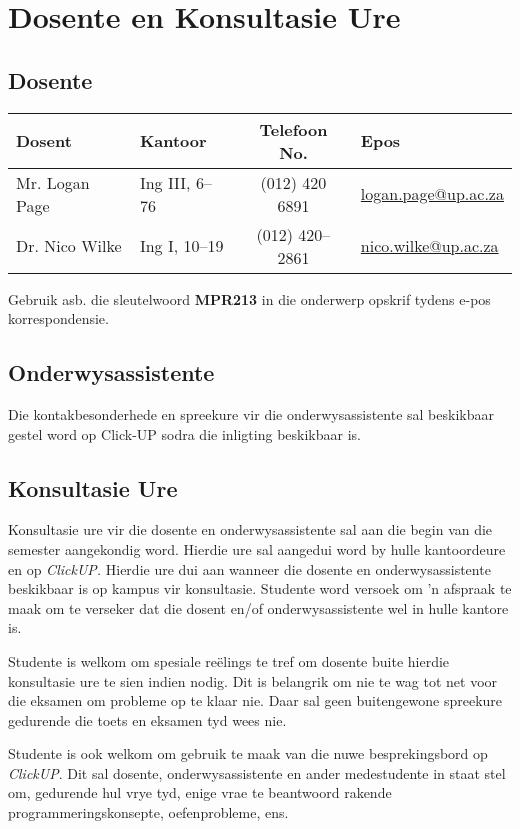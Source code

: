 \section{Dosente en Konsultasie Ure}
    \subsection{Dosente}
        \begin{table}[!h]
            \begin{center}
             \begin{tabular}{|l|l|c|l|}
                 \hline
                 {\bf Dosent} & {\bf Kantoor} & {\bf Telefoon No.} & {\bf Epos} \\
                 \hline
                 Mr. Logan Page &
                 Ing III, 6--76 &
                 (012) 420 6891 &
                 \href{mailto:logan.page@up.ac.za}{logan.page@up.ac.za} \\
                 Dr. Nico Wilke &
                 Ing I, 10--19 &
                 (012) 420--2861 &
                 \href{mailto:nico.wilke@up.ac.za}{nico.wilke@up.ac.za} \\
                 \hline
             \end{tabular}
            \end{center}
        \end{table}

      Gebruik asb. die sleutelwoord \textbf{MPR213} in die onderwerp
      opskrif tydens e-pos korrespondensie.
    
    \subsection{Onderwysassistente}
	Die kontakbesonderhede en spreekure vir die onderwysassistente sal
	beskikbaar gestel word op Click-UP sodra die inligting beskikbaar is.
    
    \subsection{Konsultasie Ure}
        Konsultasie ure vir die dosente en onderwysassistente sal aan die begin 
        van die semester aangekondig word.  Hierdie ure sal aangedui word by 
        hulle kantoordeure en op \textit{ClickUP.}  Hierdie ure dui aan wanneer die 
        dosente en onderwysassistente beskikbaar is op kampus vir konsultasie.
        Studente word versoek om 'n afspraak te maak om te verseker dat die 
        dosent en/of onderwysassistente wel in hulle kantore is.
        
        Studente is welkom om spesiale re\"{e}lings te tref om dosente buite hierdie
        konsultasie ure te sien indien nodig.  Dit is belangrik om nie te wag tot 
        net voor die eksamen om probleme op te klaar nie.  Daar sal geen 
        buitengewone spreekure gedurende die toets en eksamen tyd wees nie.
        
        Studente is ook welkom om gebruik te maak van die nuwe
        besprekingsbord op \textit{ClickUP}.  Dit sal dosente,
        onderwysassistente en ander medestudente in staat stel om,
        gedurende hul vrye tyd, enige vrae te beantwoord rakende
        programmeringskonsepte, oefenprobleme, ens.
